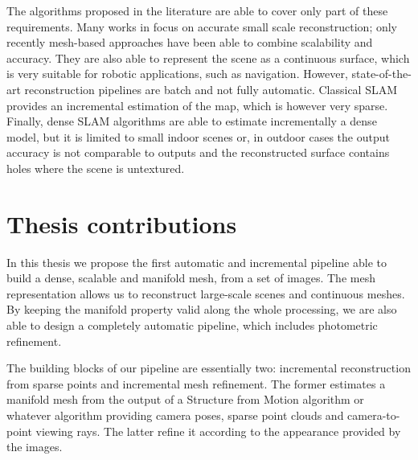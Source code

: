 The algorithms proposed in the literature are able to cover only part of these requirements.
Many works in \mvs focus on accurate small scale reconstruction; only recently mesh-based approaches have been able to combine scalability and accuracy. They are also able to represent the scene as  a continuous surface, which is very suitable for robotic applications, such as navigation.
However, state-of-the-art \mvs reconstruction pipelines are batch and not fully automatic. 
Classical SLAM provides an incremental estimation of the map, which is however very sparse.
Finally, dense SLAM algorithms are able to estimate incrementally a dense model, but it is limited to small indoor scenes or, in outdoor cases the output accuracy is not comparable to \mvs outputs and the reconstructed surface contains holes where the scene is untextured.

\section{Thesis contributions}
In this thesis we propose the first automatic and incremental pipeline able to build a dense, scalable and manifold mesh, from a set of images.
The mesh representation allows us  to reconstruct  large-scale scenes and continuous meshes.
By keeping the manifold property valid along the whole processing, we are also able to design a completely automatic pipeline, which includes photometric refinement.


The building blocks of our pipeline are essentially two: incremental reconstruction from sparse points and incremental mesh refinement.
The former estimates a  manifold mesh from the output of a Structure from Motion algorithm or whatever algorithm providing camera poses, sparse point clouds and camera-to-point viewing rays. The latter refine it according to the appearance provided by the images.

